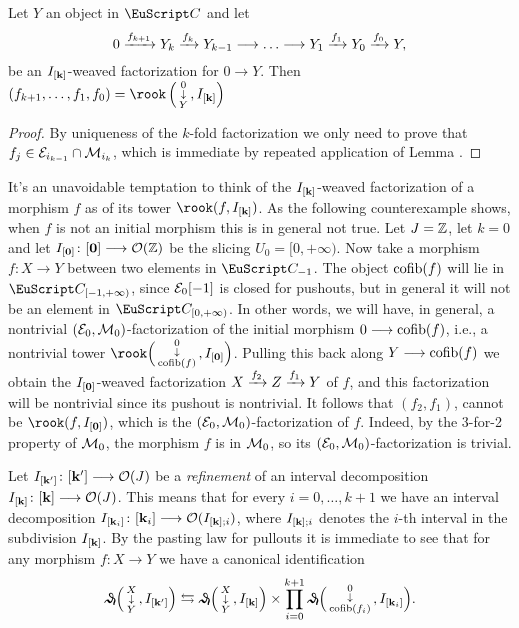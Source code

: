 \begin{corollary}\label{perPostnikov2} 
Let $Y$ an object in $\C$ and let 
\[
0 \xto{f_{k+1}} Y_{k} \xto{f_k}Y_{{k-1}}\to\dots\to Y_{1} \xto{f_1} Y_{0} \xto{f_0} Y,
\]
be an $I_{[\mathbf{k}]}$-weaved factorization for $0\to Y$. Then $(f_{k+1},\dots,f_1,f_0)=\rook\left(\varnobkt{0}{Y},I_{\ordk}\right)$
\end{corollary}
\begin{proof}
By uniqueness of the $k$-fold factorization we only need to prove that $f_j\in \mathcal{E}_{i_{k-1}}\cap \mathcal{M}_{i_k}$, which is immediate by repeated application of Lemma . 
\end{proof}





\begin{remark}
It's an unavoidable temptation to think of the $I_{[\mathbf{k}]}$-weaved factorization of a morphism $f$ as of its tower $\rook(f,I_{\ordk})$.
As the following counterexample shows, when $f$ is not an initial morphism this is in general not true. Let $J=\mathbb{Z}$, let $k=0$ and let $I_{[\mathbf{0}]}\colon [\mathbf{0}]\longrightarrow \mathcal{O}(\mathbb{Z})$ be the slicing $U_0=[0,+\infty)$. Now take a morphism $f\colon X\to Y$ between two elements in $\C_{-1}$. The object $\operatorname{cofib}(f)$ will lie in $\C_{[-1,+\infty)}$, since $\mathcal{E}_0[-1]$ is closed for pushouts, but in general it will not be an element in $\C_{[0,+\infty)}$. In other words, we will have, in general, a nontrivial $(\mathcal{E}_0,\mathcal{M}_0)$-factorization of the initial morphism $0\longrightarrow \operatorname{cofib}(f)$, i.e., a nontrivial tower $\rook\Big(\varnobkt{0}{\cofib(f)},I_{\ordered{0}}\Big)$. Pulling this back along $Y\longrightarrow \operatorname{cofib}(f)$ we obtain the $I_{[\mathbf{0}]}$-weaved factorization $X\xrightarrow{f_2} Z\xrightarrow{f_1} Y$ of $f$, and this factorization will be nontrivial since its pushout is nontrivial. It follows that $(f_2,f_1)$, cannot be $\rook(f,I_{\ordered{0}})$, which is the $(\mathcal{E}_0,\mathcal{M}_0)$-factorization of $f$. Indeed, by the 3-for-2 property of $\mathcal{M}_0$, the morphism $f$ is in $\mathcal{M}_0$, so its $(\mathcal{E}_0,\mathcal{M}_0)$-factorization is trivial. 
\end{remark}

\begin{remark}\label{rem.infittimento1}
Let $I_{[\mathbf{k'}]}\colon [\mathbf{k'}]\longrightarrow \mathcal{O}(J)$ be a \emph{refinement} of an interval decomposition $I_{[\mathbf{k}]}\colon [\mathbf{k}]\longrightarrow \mathcal{O}(J)$. This means that for every $i=0,\dots,k+1$ we have an interval decomposition $I_{[\mathbf{k}_i]}\colon [\mathbf{k}_i]\longrightarrow \mathcal{O}(I_{[\mathbf{k}];i})$, where $I_{[\mathbf{k}];i}$ denotes the $i$-th interval in the subdivision $I_{[\mathbf{k}]}$. By the pasting law for pullouts it is immediate to see that for any morphism $f\colon X \to Y$ we have a canonical identification
\[
\weaves\Big(\varnobkt{X}{Y},I_{\ordered{k'}}\Big) \leftrightarrows \weaves\Big(\varnobkt{X}{Y},I_{\ordk}\Big)\times \prod_{i=0}^{k+1}\weaves\Big(\varnobkt{0}{\cofib(f_i)}, I_{[\mathbf{k}_i]}\Big).
\]
\end{remark}


